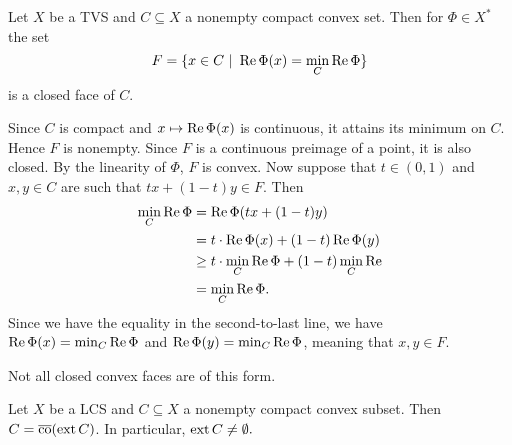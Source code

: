 \begin{lemma}
  Let $X$ be a TVS and $C \subseteq X$ a nonempty compact convex set.
  Then for $\Phi \in X^*$ the set 
  $$F = \{x \in C\ |\ \operatorname{Re} \Phi (x) = \min_C \operatorname{Re} \Phi\}$$
  is a closed face of $C$.
\end{lemma}

\begin{myproof}
  Since $C$ is compact and $x \mapsto \operatorname{Re} \Phi(x)$
  is continuous, it attains its minimum on $C$. Hence $F$ is nonempty.
  Since $F$ is a continuous preimage of a point, it is also closed.
  By the linearity of $\Phi$, $F$ is convex. 
  Now suppose that $t \in (0, 1)$ and $x, y \in C$ are such that 
  $tx + (1 - t)y \in F$. Then
  \begin{align*}
    \min_C \operatorname{Re} \Phi &= \operatorname{Re} \Phi (tx + (1 - t)y)\\
    &= t \cdot \operatorname{Re} \Phi(x) + (1 - t) \operatorname{Re} \Phi (y)\\
    &\geq t \cdot \min_C \operatorname{Re} \Phi + (1 - t) \min_C \operatorname{Re}\\
    &= \min_C \operatorname{Re} \Phi. 
  \end{align*}
  Since we have the equality in the second-to-last line, we have 
  $\operatorname{Re} \Phi (x) = \min_C \operatorname{Re} \Phi$
  and $\operatorname{Re} \Phi (y) = \min_C \operatorname{Re} \Phi$, meaning that $x, y \in F$.
\end{myproof}

\begin{remark}
  Not all closed convex faces are of this form. 
\end{remark}

\begin{theorem}
  Let $X$ be a LCS and $C \subseteq X$ a nonempty compact convex subset.
  Then $C = \overline{\operatorname{co}} (\operatorname{ext} C)$. In particular, $\operatorname{ext} C \neq \emptyset.$
\end{theorem}

